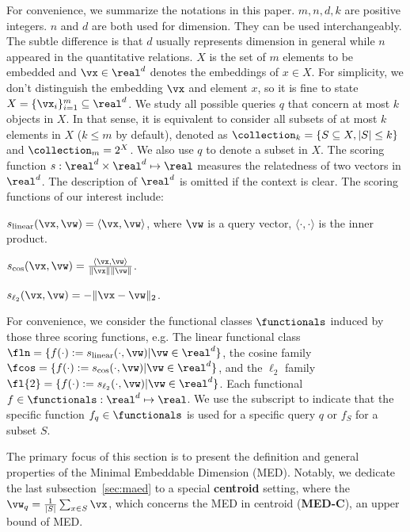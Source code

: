 For convenience, we summarize the notations in this paper.
$m, n, d, k$ are positive integers. $n$ and $d$ are both used for dimension. They can be used interchangeably. The subtle difference is that $d$ usually represents dimension in general while $n$ appeared in the quantitative relations. $X$ is the set of $m$ elements to be embedded and $\vx \in \real^d$ denotes the embeddings of $x\in X$. For simplicity, we don't distinguish the embedding $\vx$ and element $x$, so it is fine to state $X = \{\vx_i\}_{i=1}^m \subseteq \real^d$.
We study all possible queries $q$ that concern at most $ k$ objects in $X$. In that sense, it is equivalent to consider all subsets of at most $k$ elements in $X$ ($k \leq m$ by default), denoted as $ \collection_k=\{S\subseteq X, |S|\leq k\}$ and $\collection_m=2^X$. We also use $q$ to denote a subset in $X$.
The scoring function $s: \real^d \times \real^d\mapsto \real$ measures the relatedness of two vectors in $\real^d$. The description of $\real^d$ is omitted if the context is clear. The scoring functions of our interest include:
\begin{compactdesc}
    \item[Linear:] $s_{\rm linear}(\vx, \vw) = \langle \vx, \vw\rangle$, where $\vw$ is a query vector, $\langle \cdot, \cdot\rangle$ is the inner product.
    \item[Cosine similarity:] $s_{\cos}(\vx, \vw) = \frac{\langle \vx, \vw \rangle }{ \|\vx\|\|\vw\|}$.
    \item[Euclidean distance ($\ell_2$):] $s_{\ell_2}(\vx, \vw) = - \|\vx - \vw\|_2 $.
\end{compactdesc}
For convenience, we consider the functional classes $\functionals$ induced by those three scoring functions, e.g. The linear functional class $\fln = \{f(\cdot ):= s_{\rm linear}(\cdot, \vw) | \vw \in \real^d\}$, the cosine family$\fcos = \{  f(\cdot ):= s_{\cos}(\cdot, \vw) | \vw \in \real^d\}$, and the $\ell_2$ family $\fl{2} = \{f(\cdot ):= s_{\ell_2}(\cdot, \vw) | \vw \in \real^d\}$. Each functional $f\in \functionals: \real^d\mapsto\real$. We use the subscript to indicate that the specific function $f_q\in \functionals$ is used for a specific query $q$ or $f_S$ for a subset $S$.



The primary focus of this section is to present the definition and general properties of the Minimal Embeddable Dimension (MED). Notably, we dedicate the last subsection~\ref{sec:maed} to a special \textbf{centroid} setting, where the $\vw_q = \frac{1}{|S|} \sum_{x\in S} \vx$, which concerns the MED in centroid (\textbf{MED-C}), an upper bound of MED.

